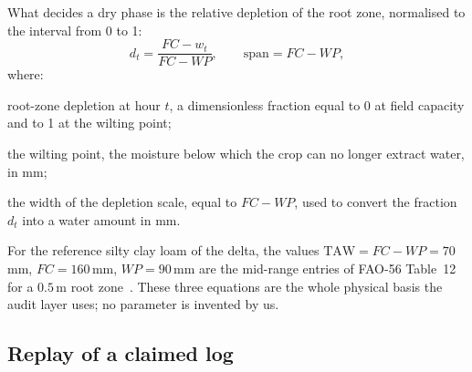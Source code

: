 What decides a dry phase is the relative depletion of the root zone, normalised to the
interval from 0 to 1:
\begin{equation}
d_t=\frac{FC-w_t}{FC-WP},\qquad \mathrm{span}=FC-WP,
\label{eq:depl}
\end{equation}
where:
\begin{symbolist}
\item[$d_t$] root-zone depletion at hour $t$, a dimensionless fraction equal to 0 at
  field capacity and to 1 at the wilting point;
\item[$WP$] the wilting point, the moisture below which the crop can no longer
  extract water, in mm;
\item[$\mathrm{span}$] the width of the depletion scale, equal to $FC-WP$, used to
  convert the fraction $d_t$ into a water amount in mm.
\end{symbolist}

For the reference silty clay loam of the delta, the values
$\mathrm{TAW}=FC-WP=70$\,mm, $FC=160$\,mm, $WP=90$\,mm are the mid-range entries
of FAO-56 Table~12 for a $0.5$\,m root zone~\cite{fao56}. These three equations are
the whole physical basis the audit layer uses; no parameter is invented by us.

\subsection{Replay of a claimed log}
\label{sec:replay}

